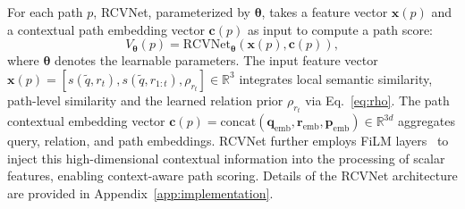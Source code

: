 \documentclass{article}
\theoremstyle{plain}
\theoremstyle{definition}
\theoremstyle{remark}
\begin{document}
For each path $p$, RCVNet, parameterized by $\bm{\theta}$, takes a feature vector $\mathbf{x}(p)$ and a contextual path embedding vector $\mathbf{c}(p)$ as input to compute a path score:
\begin{equation}
V_{\bm\theta}(p) = \text{RCVNet}_{\bm\theta}(\mathbf{x}(p), \mathbf{c}(p)),
\label{eq:vfinal}
\end{equation}
where $\bm\theta$ denotes the learnable parameters. The input feature vector $\mathbf{x}(p) = [s(\tilde{q}, r_t), s(\tilde{q}, r_{1:t}), \rho_{r_t}] \in \mathbb{R}^3$ integrates local semantic similarity, path-level similarity and the learned relation prior $\rho_{r_t}$ via Eq.~\ref{eq:rho}. The path contextual embedding vector $\mathbf{c}(p) = \text{concat}(\mathbf{q}_{\text{emb}}, \mathbf{r}_{\text{emb}}, \mathbf{p}_{\text{emb}}) \in \mathbb{R}^{3d}$ aggregates query, relation, and path embeddings. RCVNet further employs FiLM layers~\cite{FiLM} to inject this high-dimensional contextual information into the processing of scalar features, enabling context-aware path scoring. Details of the RCVNet architecture are provided in Appendix~\ref{app:implementation}.

\end{document}
